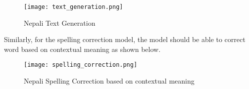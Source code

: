 \begin{figure}[H]
    \centering
    \texttt{[image: text\_generation.png]}
    \caption{Nepali Text Generation}
    \label{fig:Nepali Text Generation}
\end{figure}

Similarly, for the spelling correction model, the model should be able to correct word based on contextual meaning as shown below.

\begin{figure}[H]
    \centering
    \texttt{[image: spelling\_correction.png]}
    \caption{Nepali Spelling Correction based on contextual meaning}
    \label{fig:Nepali Spelling Correction}
\end{figure}